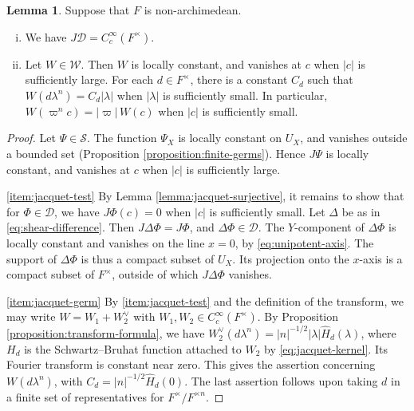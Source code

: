 \documentclass[reqno]{amsart}
\theoremstyle{plain}
\theoremstyle{definition}
\theoremstyle{itplain}
\newtheorem{lemma}[theorem]{Lemma}
\numberwithin{equation}{section}
\numberwithin{theorem}{section}
\begin{document}
\begin{lemma}\label{lemma:jacquet-germ}
  Suppose that $F$ is non-archimedean.
  \begin{enumerate}[(i)]
  \item\label{item:jacquet-test} We have $J \mathcal{D} = C_c^\infty(F^\times)$.
  \item\label{item:jacquet-germ} Let $W \in \mathcal{W}$.  Then $W$ is locally constant, and vanishes at $c$ when $\lvert c \rvert$ is sufficiently large.  For each $d \in F^\times$, there is a constant $C_d$ such that $W(d \lambda^n) = C_d \lvert \lambda \rvert$ when $\lvert \lambda \rvert$ is sufficiently small.  In particular, $W(\varpi^n c) = \lvert \varpi \rvert \, W(c)$ when $\lvert c \rvert$ is sufficiently small.
  \end{enumerate}
\end{lemma}
\begin{proof}
  Let $\Psi \in \mathcal{S}$.  The function $\Psi_X$ is locally constant on $U_X$, and vanishes outside a bounded set (Proposition \ref{proposition:finite-germs}).  Hence $J \Psi$ is locally constant, and vanishes at $c$ when $\lvert c \rvert$ is sufficiently large.

  \eqref{item:jacquet-test} By Lemma \ref{lemma:jacquet-surjective}, it remains to show that for $\Phi \in \mathcal{D}$, we have $J \Phi(c) = 0$ when $\lvert c \rvert$ is sufficiently small.  Let $\Delta$ be as in \eqref{eq:shear-difference}.  Then $J \Delta \Phi = J \Phi$, and $\Delta \Phi \in \mathcal{D}$.  The $Y$-component of $\Delta \Phi$ is locally constant and vanishes on the line $x = 0$, by \eqref{eq:unipotent-axis}.  The support of $\Delta \Phi$ is thus a compact subset of $U_X$.  Its projection onto the $x$-axis is a compact subset of $F^\times$, outside of which $J \Delta \Phi$ vanishes.

  \eqref{item:jacquet-germ} By \eqref{item:jacquet-test} and the definition of the transform, we may write $W = W_1 + W_2^\vee$ with $W_1, W_2 \in C_c^\infty(F^\times)$.  By Proposition \ref{proposition:transform-formula}, we have $W_2^\vee(d \lambda^n) = \lvert n \rvert^{-1/2} \lvert \lambda \rvert \hat{H}_d(\lambda)$, where $H_d$ is the Schwartz--Bruhat function attached to $W_2$ by \eqref{eq:jacquet-kernel}.  Its Fourier transform is constant near zero.  This gives the assertion concerning $W(d \lambda^n)$, with $C_d = \lvert n \rvert^{-1/2} \hat{H}_d(0)$.  The last assertion follows upon taking $d$ in a finite set of representatives for $F^\times / F^{\times n}$.
\end{proof}
\end{document}

